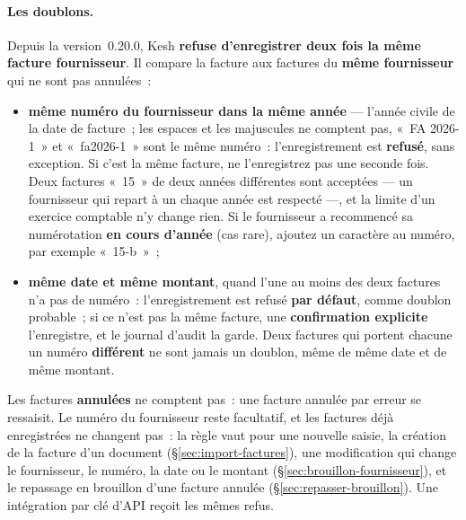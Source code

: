 \documentclass[a4paper,11pt,oneside]{article}
\begin{document}
\paragraph{Les doublons.}\label{sec:doublons-fournisseur} Depuis la version~0.20.0, Kesh
\textbf{refuse d'enregistrer deux fois la même facture fournisseur}. Il compare la facture aux
factures du \textbf{même fournisseur} qui ne sont pas annulées~:
\begin{itemize}
    \item \textbf{même numéro du fournisseur dans la même année} --- l'année civile de la date de
          facture~; les espaces et les majuscules ne comptent pas, «~FA 2026-1~» et
          «~fa2026-1~» sont le même numéro~: l'enregistrement est \textbf{refusé}, sans
          exception. Si c'est la même facture, ne l'enregistrez pas une seconde fois. Deux
          factures «~15~» de deux années différentes sont acceptées --- un fournisseur qui
          repart à un chaque année est respecté ---, et la limite d'un exercice comptable n'y
          change rien. Si le fournisseur a recommencé sa numérotation \textbf{en cours d'année}
          (cas rare), ajoutez un caractère au numéro, par exemple «~15-b~»~;
    \item \textbf{même date et même montant}, quand l'une au moins des deux factures n'a pas de
          numéro~: l'enregistrement est refusé \textbf{par défaut}, comme doublon probable~;
          si ce n'est pas la même facture, une \textbf{confirmation explicite} l'enregistre, et
          le journal d'audit la garde. Deux factures qui portent chacune un numéro
          \textbf{différent} ne sont jamais un doublon, même de même date et de même montant.
\end{itemize}
Les factures \textbf{annulées} ne comptent pas~: une facture annulée par erreur se ressaisit. Le
numéro du fournisseur reste facultatif, et les factures déjà enregistrées ne changent pas~: la
règle vaut pour une nouvelle saisie, la création de la facture d'un document
(\S\ref{sec:import-factures}), une modification qui change le fournisseur, le numéro, la date
ou le montant (\S\ref{sec:brouillon-fournisseur}), et le repassage en brouillon d'une facture
annulée (\S\ref{sec:repasser-brouillon}). Une intégration par clé d'API reçoit les mêmes refus.
\end{document}
